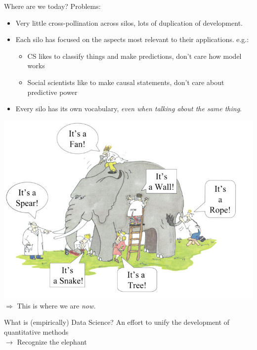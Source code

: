 \documentclass[11pt]{beamer}
\begin{document}
\begin{frame}[c]{Where are we today?}
Problems:
\begin{itemize}
	\pause \item Very little cross-pollination across silos, lots of duplication of development.
	\pause \item Each silo has focused on the aspects most relevant to their applications. e.g.:
	\begin{itemize}
		\pause \item CS likes to classify things and make predictions, don't care how model works
		\item Social scientists like to make causal statements, don't care about predictive power
	\end{itemize}
	\pause \item Every silo has its own vocabulary, \emph{even when talking about the same thing}.
\end{itemize}
\end{frame}

\begin{frame}[c]{}
\pause \includegraphics[width=\textwidth]{blindmenelephant.jpg}
\pause $\Rightarrow$ This is where we are \emph{now.}
\end{frame}

\begin{frame}[c]{What is (empirically) Data Science?}
\pause An effort to unify the development of quantitative methods \\
\pause $\rightarrow$ Recognize the elephant
\end{frame}
\end{document}
